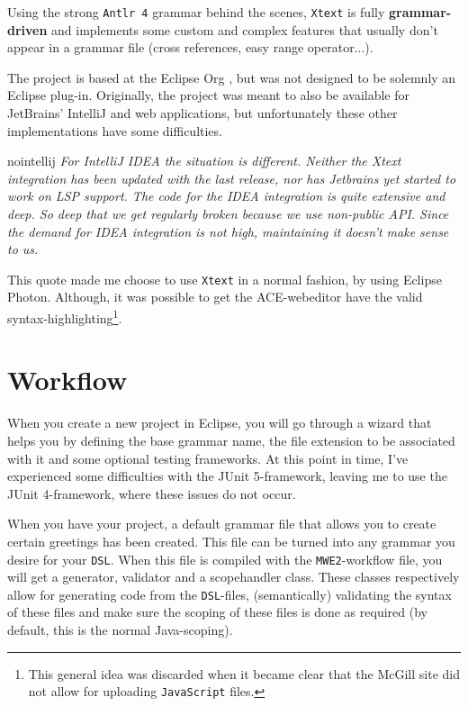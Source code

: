 \documentclass[review]{elsarticle}
\begin{document}
Using the strong \texttt{Antlr 4} \cite{antlr} grammar behind the scenes, \texttt{Xtext} is fully \textbf{grammar-driven} and implements some custom and complex features that usually don't appear in a grammar file (cross references, easy range operator...).

The project is based at the \textsf{Eclipse Org} \cite{eclipse}, but was not designed to be solemnly an \textsf{Eclipse} plug-in. Originally, the project was meant to also be available for \textsf{JetBrains}' \textsf{IntelliJ} and web applications, but unfortunately these other implementations have some difficulties.

\begin{displaycquote}{nointellij}
	\textit{For IntelliJ IDEA the situation is different. Neither the Xtext integration has been updated with the last release, nor has Jetbrains yet started to work on LSP support. The code for the IDEA integration is quite extensive and deep. So deep that we get regularly broken because we use non-public API. Since the demand for IDEA integration is not high, maintaining it doesn’t make sense to us.}
\end{displaycquote}

This quote made me choose to use \texttt{Xtext} in a normal fashion, by using \textsf{Eclipse Photon}. Although, it was possible to get the \textsf{ACE}-webeditor have the valid syntax-highlighting\footnote{This general idea was discarded when it became clear that the McGill site did not allow for uploading \texttt{JavaScript} files.}.

\section{Workflow}
\label{sec:workflow}
When you create a new project in \textsf{Eclipse}, you will go through a wizard that helps you by defining the base grammar name, the file extension to be associated with it and some optional testing frameworks. At this point in time, I've experienced some difficulties with the \textsf{JUnit 5}-framework, leaving me to use the \textsf{JUnit 4}-framework, where these issues do not occur.

When you have your project, a default grammar file that allows you to create certain greetings has been created. This file can be turned into any grammar you desire for your \texttt{DSL}. When this file is compiled with the \texttt{MWE2}-workflow file, you will get a generator, validator and a scopehandler class. These classes respectively allow for generating code from the \texttt{DSL}-files, (semantically) validating the syntax of these files and make sure the scoping of these files is done as required (by default, this is the normal \textsf{Java}-scoping).
\end{document}

